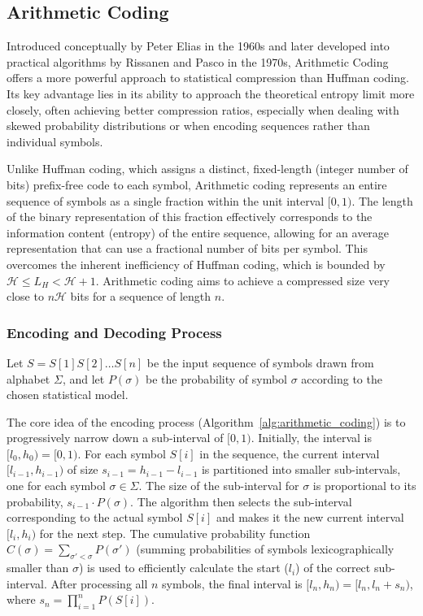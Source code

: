 \subsection{Arithmetic Coding} \label{subsec:arithmetic_coding}

Introduced conceptually by Peter Elias in the 1960s and later developed into practical algorithms by Rissanen \cite{rissanen1976generalized} and Pasco \cite{pasco1976source} in the 1970s, Arithmetic Coding offers a more powerful approach to statistical compression than Huffman coding. Its key advantage lies in its ability to approach the theoretical entropy limit more closely, often achieving better compression ratios, especially when dealing with skewed probability distributions or when encoding sequences rather than individual symbols.

Unlike Huffman coding, which assigns a distinct, fixed-length (integer number of bits) prefix-free code to each symbol, Arithmetic coding represents an entire sequence of symbols as a single fraction within the unit interval $[0, 1)$. The length of the binary representation of this fraction effectively corresponds to the information content (entropy) of the entire sequence, allowing for an average representation that can use a fractional number of bits per symbol. This overcomes the inherent inefficiency of Huffman coding, which is bounded by $\mathcal{H} \le L_H < \mathcal{H} + 1$. Arithmetic coding aims to achieve a compressed size very close to $n\mathcal{H}$ bits for a sequence of length $n$.

\subsubsection{Encoding and Decoding Process}
Let $S = S[1]S[2]\ldots S[n]$ be the input sequence of symbols drawn from alphabet $\Sigma$, and let $P(\sigma)$ be the probability of symbol $\sigma$ according to the chosen statistical model.

The core idea of the encoding process (Algorithm~\ref{alg:arithmetic_coding}) is to progressively narrow down a sub-interval of $[0, 1)$. Initially, the interval is $[l_0, h_0) = [0, 1)$. For each symbol $S[i]$ in the sequence, the current interval $[l_{i-1}, h_{i-1})$ of size $s_{i-1} = h_{i-1} - l_{i-1}$ is partitioned into smaller sub-intervals, one for each symbol $\sigma \in \Sigma$. The size of the sub-interval for $\sigma$ is proportional to its probability, $s_{i-1} \cdot P(\sigma)$. The algorithm then selects the sub-interval corresponding to the actual symbol $S[i]$ and makes it the new current interval $[l_i, h_i)$ for the next step. The cumulative probability function $C(\sigma) = \sum_{\sigma' < \sigma} P(\sigma')$ (summing probabilities of symbols lexicographically smaller than $\sigma$) is used to efficiently calculate the start ($l_i$) of the correct sub-interval. After processing all $n$ symbols, the final interval is $[l_n, h_n) = [l_n, l_n + s_n)$, where $s_n = \prod_{i=1}^n P(S[i])$.

